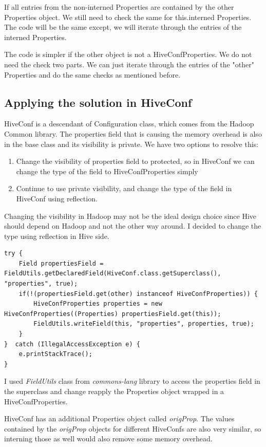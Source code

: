 If all entries from the non-interned Properties are contained by the other Properties object. We still need to check the same for this.interned Properties. The code will be the same except, we will iterate through the entries of the interned Properties. 

The code is simpler if the other object is not a HiveConfProperties. We do not need the check two parts. We can just iterate through the entries of the "other" Properties and do the same checks as mentioned before.

\subsection{Applying the solution in HiveConf}
HiveConf is a descendant of Configuration class, which comes from the Hadoop Common library. The properties field that is causing the memory overhead is also in the base class and its visibility is private. We have two options to resolve this:
\begin{enumerate}
	\item Change the visibility of properties field to protected, so in HiveConf we can change the type of the field to HiveConfProperties simply
	\item Continue to use private visibility, and change the type of the field in HiveConf using reflection.
\end{enumerate}

Changing the visibility in Hadoop may not be the ideal design choice since Hive should depend on Hadoop and not the other way around. I decided to change the type using reflection in Hive side. 

\begin{lstlisting}
try {
	Field propertiesField = FieldUtils.getDeclaredField(HiveConf.class.getSuperclass(), "properties", true);
	if(!(propertiesField.get(other) instanceof HiveConfProperties)) {
		HiveConfProperties properties = new HiveConfProperties((Properties) propertiesField.get(this));
		FieldUtils.writeField(this, "properties", properties, true);
	}
}  catch (IllegalAccessException e) {
	e.printStackTrace();
}
\end{lstlisting}

I used \textit{FieldUtils} class from \textit{commons-lang} library to access the properties field in the superclass and change reapply the Properties object wrapped in a HiveConfProperties.

HiveConf has an additional Properties object called \textit{origProp}. The values contained by the \textit{origProp} objects for different HiveConfs are also very similar, so interning those as well would also remove some memory overhead. 

